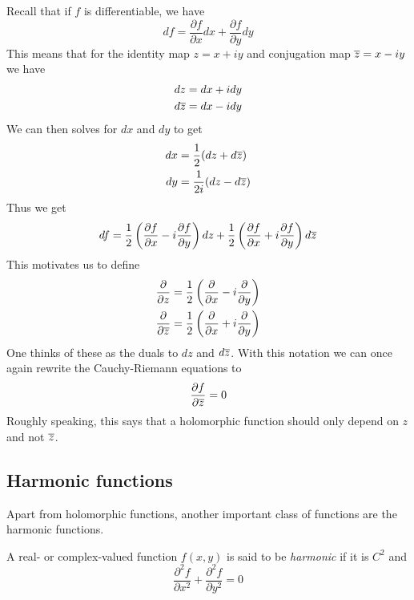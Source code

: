 Recall that if $f$ is differentiable, we have
$$df = \frac{\partial f}{\partial x}dx + \frac{\partial f}{\partial y}dy$$
This means that for the identity map $z = x + iy$ and conjugation map $\overline{z} = x - iy$ we have
\begin{align*}
    dz &= dx + idy\\
    d\overline{z} &= dx - idy
\end{align*}
We can then solves for $dx$ and $dy$ to get
\begin{align*}
    dx &= \frac{1}{2}(dz + d\overline{z})\\
    dy &= \frac{1}{2i}(dz - d\overline{z})
\end{align*}
Thus we get
$$df = \frac{1}{2}\left( \frac{\partial f}{\partial x} - i \frac{\partial f}{\partial y} \right)dz + \frac{1}{2} \left( \frac{\partial f}{\partial x} + i \frac{\partial f}{\partial y} \right) d \overline{z}$$
This motivates us to define
\begin{align*}
    \frac{\partial}{\partial z} &= \frac{1}{2} \left( \frac{\partial}{\partial x} - i \frac{\partial}{\partial y} \right)\\
    \frac{\partial}{\partial \overline{z}} &= \frac{1}{2} \left( \frac{\partial}{\partial x} + i \frac{\partial}{\partial y} \right)
\end{align*}
One thinks of these as the duals to $dz$ and $d\overline{z}$. With this notation we can once again rewrite the Cauchy-Riemann equations to 
$$\frac{\partial f}{\partial \overline{z}} = 0$$
Roughly speaking, this says that a holomorphic function should only depend on $z$ and not $\overline{z}$.

\subsection{Harmonic functions}
Apart from holomorphic functions, another important class of functions are the harmonic functions.
\begin{definition}
A real- or complex-valued function $f(x, y)$ is said to be \textit{harmonic} if it is $C^2$ and
$$\frac{\partial^2 f}{\partial x^2} + \frac{\partial^2 f}{\partial y^2} = 0$$
\end{definition}


